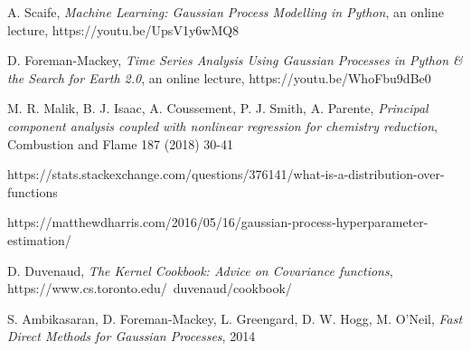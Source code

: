 \documentclass[10pt,twocolumn]{article}
\begin{document}
 A. Scaife, \textit{Machine Learning: Gaussian Process Modelling in Python}, an online lecture, https://youtu.be/UpsV1y6wMQ8

 D. Foreman-Mackey, \textit{Time Series Analysis Using Gaussian Processes in Python \& the Search for Earth 2.0}, an online lecture, https://youtu.be/WhoFbu9dBe0

 M. R. Malik, B. J. Isaac, A. Coussement, P. J. Smith, A. Parente, \textit{Principal component analysis coupled with nonlinear regression for chemistry reduction}, Combustion and Flame 187 (2018) 30-41

 https://stats.stackexchange.com/questions/376141/what-is-a-distribution-over-functions

\bibitem{} https://matthewdharris.com/2016/05/16/gaussian-process-hyperparameter-estimation/

 D. Duvenaud, \textit{The Kernel Cookbook: Advice on Covariance functions}, https://www.cs.toronto.edu/~duvenaud/cookbook/

 S. Ambikasaran, D. Foreman-Mackey, L. Greengard, D. W. Hogg, M. O'Neil, \textit{Fast Direct Methods for Gaussian Processes}, 2014
\end{document}
